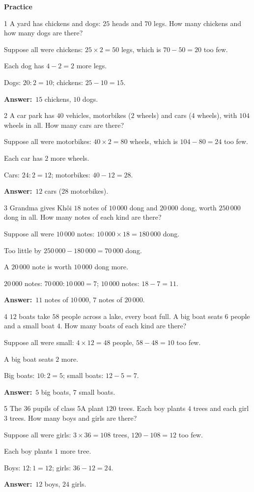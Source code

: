 \documentclass[11pt]{article}
\newif\ifsol \solfalse
\providecommand{\AnsWord}{Đáp số}
\newcommand{\dapso}[1]{\par\textbf{\AnsWord:}\ #1}
\newcommand{\probsol}[1]{%
  \begin{lrbox}{\solmeasure}\begin{minipage}{\dimexpr\linewidth-24pt\relax}#1\end{minipage}\end{lrbox}%
  \ifsol
    \begin{solbox}#1\end{solbox}%
  \else
    \setlength{\solht}{\dimexpr\ht\solmeasure+\dp\solmeasure+0.85cm\relax}%
    \ifdim\solht<1.35cm\setlength{\solht}{1.35cm}\fi
    \begin{tcolorbox}[colback=white,colframe=Line,boxrule=0.8pt,arc=5pt,
      left=8pt,right=8pt,top=4pt,bottom=4pt,height=\solht]{\footnotesize\color{Slate}\itshape\WorkWord}\end{tcolorbox}%
  \fi}
\newcommand{\dividerbar}[1]{\par\vspace{0.6em}\noindent
  \begin{tcolorbox}[enhanced,frame hidden,interior hidden,borderline west={5pt}{0pt}{ProbBlue},
    colback=white,left=12pt,right=12pt,top=5pt,bottom=5pt,arc=4pt]
  {\large\bfseries\color{ProbBlue} #1}\end{tcolorbox}\vspace{0.4em}}
\newcommand{\gap}{\vspace{0.3cm}}
\def\WorkWord{Your work:}
\def\AnsWord{Answer}
\begin{document}
\dividerbar{Practice}
\begin{probbox}{1}{\relax}
A yard has chickens and dogs: $25$ heads and $70$ legs. How many chickens and how many dogs are there?
\end{probbox}
\probsol{
Suppose all were chickens: $25\times2=50$ legs, which is $70-50=20$ too few.\par
Each dog has $4-2=2$ more legs.\par Dogs: $20:2=10$; chickens: $25-10=15$.
\dapso{$15$ chickens, $10$ dogs.}}
\gap
\begin{probbox}{2}{\relax}
A car park has $40$ vehicles, motorbikes ($2$ wheels) and cars ($4$ wheels), with $104$ wheels in all. How many cars are there?
\end{probbox}
\probsol{
Suppose all were motorbikes: $40\times2=80$ wheels, which is $104-80=24$ too few.\par
Each car has $2$ more wheels.\par Cars: $24:2=12$; motorbikes: $40-12=28$.
\dapso{$12$ cars ($28$ motorbikes).}}
\gap
\begin{probbox}{3}{\relax}
Grandma gives Khôi $18$ notes of $10\,000$ dong and $20\,000$ dong, worth $250\,000$ dong in all. How many notes of each kind are there?
\end{probbox}
\probsol{
Suppose all were $10\,000$ notes: $10\,000\times18=180\,000$ dong.\par
Too little by $250\,000-180\,000=70\,000$ dong.\par
A $20\,000$ note is worth $10\,000$ dong more.\par
$20\,000$ notes: $70\,000:10\,000=7$; $10\,000$ notes: $18-7=11$.
\dapso{$11$ notes of $10\,000$, $7$ notes of $20\,000$.}}
\gap
\begin{probbox}{4}{\relax}
$12$ boats take $58$ people across a lake, every boat full. A big boat seats $6$ people and a small boat $4$. How many boats of each kind are there?
\end{probbox}
\probsol{
Suppose all were small: $4\times12=48$ people, $58-48=10$ too few.\par
A big boat seats $2$ more.\par Big boats: $10:2=5$; small boats: $12-5=7$.
\dapso{$5$ big boats, $7$ small boats.}}
\gap
\begin{probbox}{5}{\relax}
The $36$ pupils of class 5A plant $120$ trees. Each boy plants $4$ trees and each girl $3$ trees. How many boys and girls are there?
\end{probbox}
\probsol{
Suppose all were girls: $3\times36=108$ trees, $120-108=12$ too few.\par
Each boy plants $1$ more tree.\par Boys: $12:1=12$; girls: $36-12=24$.
\dapso{$12$ boys, $24$ girls.}}
\end{document}
